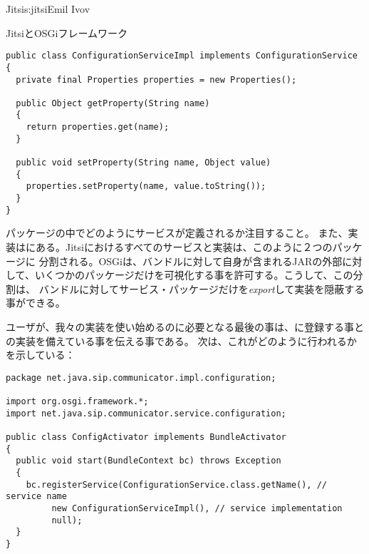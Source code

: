 \begin{aosachapter}{Jitsi}{s:jitsi}{Emil Ivov}
\begin{aosasect1}{JitsiとOSGiフレームワーク}
\begin{verbatim}
public class ConfigurationServiceImpl implements ConfigurationService
{
  private final Properties properties = new Properties();

  public Object getProperty(String name)
  {
    return properties.get(name);
  }

  public void setProperty(String name, Object value)
  {
    properties.setProperty(name, value.toString());
  }
}
\end{verbatim}

\noindent {}パッケージの中でどのようにサービスが定義されるか注目すること。
また、実装はにある。Jitsiにおけるすべてのサービスと実装は、このように２つのパッケージに
分割される。OSGiは、バンドルに対して自身が含まれるJARの外部に対して、いくつかのパッケージだけを可視化する事を許可する。こうして、この分割は、
バンドルに対してサービス・パッケージだけを\emph{export}して実装を隠蔽する事ができる。

ユーザが、我々の実装を使い始めるのに必要となる最後の事は、に登録する事との実装を備えている事を伝える事である。
次は、これがどのように行われるかを示している：

\begin{verbatim}
package net.java.sip.communicator.impl.configuration;

import org.osgi.framework.*;
import net.java.sip.communicator.service.configuration;

public class ConfigActivator implements BundleActivator
{
  public void start(BundleContext bc) throws Exception
  {
    bc.registerService(ConfigurationService.class.getName(), // service name
         new ConfigurationServiceImpl(), // service implementation
         null);
  }
}
\end{verbatim}


\end{aosasect1}
\end{aosachapter}
